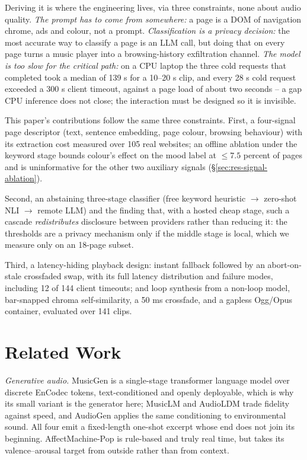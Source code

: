 \documentclass[conference]{IEEEtran}
\begin{document}
Deriving it is where the engineering lives, via three constraints, none
about audio quality. \emph{The prompt has to come from somewhere:} a page
is a DOM of navigation chrome, ads and colour, not a prompt.
\emph{Classification is a privacy decision:} the most accurate way to
classify a page is an LLM call, but doing that on every page turns a music
player into a browsing-history exfiltration channel. \emph{The model is
too slow for the critical path:} on a CPU laptop the three cold requests
that completed took a median of 139 s for a 10--20 s clip, and every 28 s
cold request exceeded a 300 s client timeout, against a page load of about
two seconds -- a gap CPU inference does not close; the interaction must be
designed so it is invisible.

This paper's contributions follow the same three constraints. First, a
four-signal page descriptor (text, sentence embedding, page
colour, browsing behaviour) with its extraction cost measured over 105 real
websites; an offline ablation under the keyword stage bounds colour's effect
on the mood label at $\leq 7.5$ percent of pages and is uninformative for
the other two auxiliary signals (\S\ref{sec:res-signal-ablation}).

Second, an abstaining three-stage classifier (free keyword heuristic $\to$
zero-shot NLI $\to$ remote LLM) and the finding that, with a hosted cheap
stage, such a cascade \emph{redistributes} disclosure between providers
rather than reducing it: the thresholds are a privacy mechanism only if
the middle stage is local, which we measure only on an 18-page subset.

Third, a latency-hiding playback design: instant fallback followed by an
abort-on-stale crossfaded swap, with its full latency distribution and
failure modes, including 12 of 144 client timeouts; and loop synthesis
from a non-loop model, bar-snapped chroma self-similarity, a 50 ms
crossfade, and a gapless Ogg/Opus container, evaluated over 141 clips.

\section{Related Work}
\label{sec:related}
\label{sec:recent-systems}

\emph{Generative audio.} MusicGen \cite{musicgen} is a single-stage
transformer language model over discrete EnCodec \cite{encodec} tokens,
text-conditioned and openly deployable, which is why its small variant is
the generator here; MusicLM \cite{musiclm} and AudioLDM \cite{audioldm}
trade fidelity against speed, and AudioGen \cite{audiogen} applies the
same conditioning to environmental sound. All four emit a fixed-length
one-shot excerpt whose end does not join its beginning. AffectMachine-Pop
\cite{affectmachine} is rule-based and truly real time, but takes its
valence--arousal target \cite{russell} from outside rather than from
context.
\end{document}
